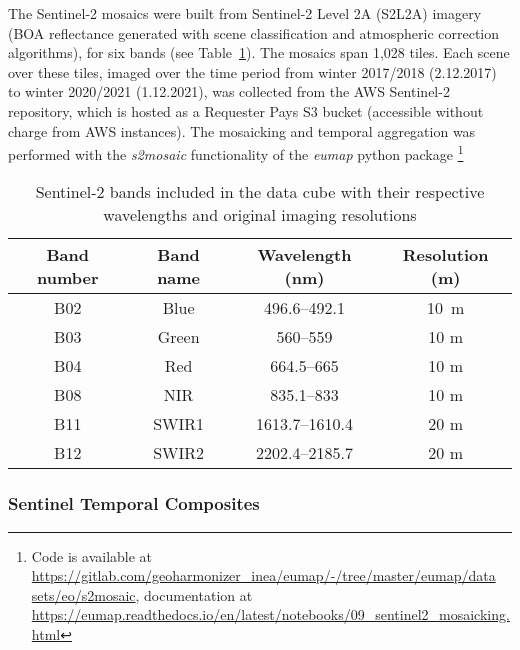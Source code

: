 The Sentinel-2 mosaics were built from Sentinel-2 Level 2A (S2L2A) imagery (BOA reflectance generated with scene classification and atmospheric correction algorithms), for six bands (see Table\@~\ref{tab:s2_bands}). The mosaics span 1,028 tiles. Each scene over these tiles, imaged over the time period from winter 2017/2018 (2.12.2017) to winter 2020/2021 (1.12.2021), was collected from the AWS Sentinel-2 repository, which is hosted as a Requester Pays S3 bucket (accessible without charge from AWS instances). The mosaicking and temporal aggregation was performed with the \emph{s2mosaic} functionality of the \emph{eumap} python package \footnote{Code is available at \url{https://gitlab.com/geoharmonizer_inea/eumap/-/tree/master/eumap/data sets/eo/s2mosaic}, documentation at \url{https://eumap.readthedocs.io/en/latest/notebooks/09_sentinel2_mosaicking.html}}

\begin{table}[hbt]
\centering
\caption{Sentinel-2 bands included in the data cube with their respective wavelengths and original imaging resolutions}
\label{tab:s2_bands}
\begin{tabular}{@{}cccc@{}}
\hline
Band number & Band name & Wavelength (nm) & Resolution (m) \\
\hline
B02 & Blue & 496.6--492.1 & 10~m \\
B03 & Green & 560--559 & 10 m \\
B04 & Red & 664.5--665 & 10 m \\
B08 & NIR & 835.1--833 & 10 m \\
B11 & SWIR1 & 1613.7--1610.4 & 20 m \\
B12 & SWIR2 & 2202.4--2185.7 & 20 m \\
\hline
\end{tabular}
\end{table}



\subsubsection*{Sentinel Temporal Composites}

